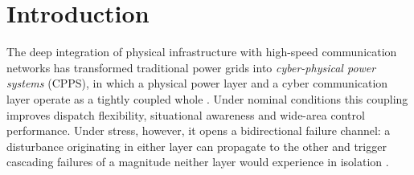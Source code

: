 
\section{Introduction}\label{sec:intro}

The deep integration of physical infrastructure with high-speed
communication networks has transformed traditional power grids into
\emph{cyber-physical power systems} (CPPS), in which a physical power
layer and a cyber communication layer operate as a tightly coupled whole
\citep{Rinaldi2001,Ouyang2014,Kundur2017CPPS}.  Under nominal conditions
this coupling improves dispatch flexibility, situational awareness and
wide-area control performance.  Under stress, however, it opens a
bidirectional failure channel: a disturbance originating in either layer
can propagate to the other and trigger cascading failures of a magnitude
neither layer would experience in isolation
\citep{Buldyrev2010,Gao2012,Guo2017AppliedEnergy}.

